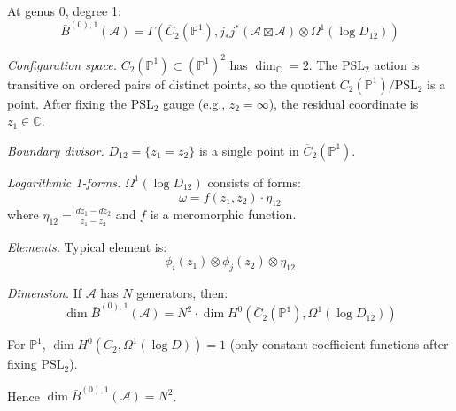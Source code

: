 \begin{example}\label{ex:bar-genus0-deg1}
At genus 0, degree 1:
\[\bar{B}^{(0),1}(\mathcal{A}) = \Gamma\left(\overline{C}_2(\mathbb{P}^1), j_*j^*(\mathcal{A} \boxtimes \mathcal{A}) \otimes \Omega^1(\log D_{12})\right)\]

\emph{Configuration space.} $C_2(\mathbb{P}^1) \subset (\mathbb{P}^1)^2$ has $\dim_\mathbb{C} = 2$.  The $\text{PSL}_2$ action is transitive on ordered pairs of distinct points, so the quotient $C_2(\mathbb{P}^1)/\text{PSL}_2$ is a point.  After fixing the $\text{PSL}_2$ gauge (e.g., $z_2 = \infty$), the residual coordinate is $z_1 \in \mathbb{C}$.

\emph{Boundary divisor.} $D_{12} = \{z_1 = z_2\}$ is a single point in $\overline{C}_2(\mathbb{P}^1)$.

\emph{Logarithmic 1-forms.} $\Omega^1(\log D_{12})$ consists of forms:
\[\omega = f(z_1, z_2) \cdot \eta_{12}\]
where $\eta_{12} = \frac{dz_1 - dz_2}{z_1 - z_2}$ and $f$ is a meromorphic function.

\emph{Elements.} Typical element is:
\[\phi_i(z_1) \otimes \phi_j(z_2) \otimes \eta_{12}\]

\emph{Dimension.} If $\mathcal{A}$ has $N$ generators, then:
\[\dim \bar{B}^{(0),1}(\mathcal{A}) = N^2 \cdot \dim H^0(\overline{C}_2(\mathbb{P}^1), \Omega^1(\log D_{12}))\]

For $\mathbb{P}^1$, $\dim H^0(\overline{C}_2, \Omega^1(\log D)) = 1$ (only constant coefficient functions after fixing $\text{PSL}_2$).

Hence $\dim \bar{B}^{(0),1}(\mathcal{A}) = N^2$.
\end{example}

